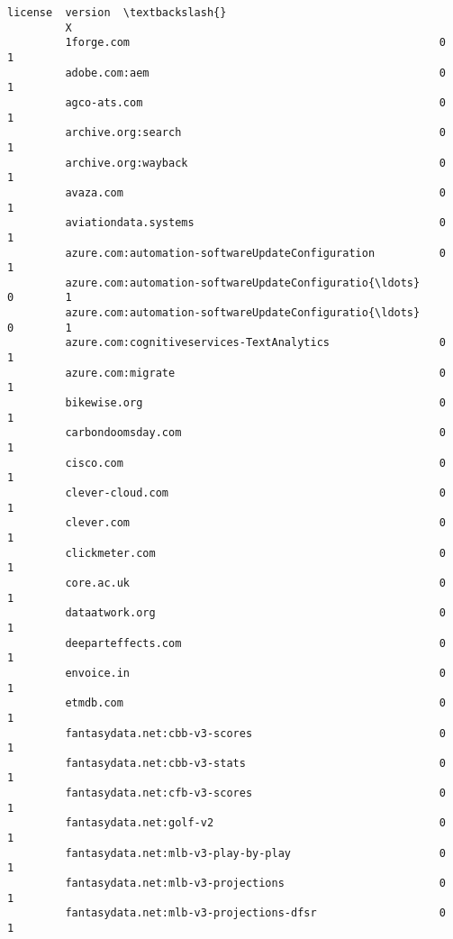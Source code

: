 \documentclass[11pt]{article}
\begin{document}
\begin{Verbatim}[commandchars=\\\{\}]
                                                             license  version  \textbackslash{}
         X                                                                      
         1forge.com                                                0        1   
         adobe.com:aem                                             0        1   
         agco-ats.com                                              0        1   
         archive.org:search                                        0        1   
         archive.org:wayback                                       0        1   
         avaza.com                                                 0        1   
         aviationdata.systems                                      0        1   
         azure.com:automation-softwareUpdateConfiguration          0        1   
         azure.com:automation-softwareUpdateConfiguratio{\ldots}        0        1   
         azure.com:automation-softwareUpdateConfiguratio{\ldots}        0        1   
         azure.com:cognitiveservices-TextAnalytics                 0        1   
         azure.com:migrate                                         0        1   
         bikewise.org                                              0        1   
         carbondoomsday.com                                        0        1   
         cisco.com                                                 0        1   
         clever-cloud.com                                          0        1   
         clever.com                                                0        1   
         clickmeter.com                                            0        1   
         core.ac.uk                                                0        1   
         dataatwork.org                                            0        1   
         deeparteffects.com                                        0        1   
         envoice.in                                                0        1   
         etmdb.com                                                 0        1   
         fantasydata.net:cbb-v3-scores                             0        1   
         fantasydata.net:cbb-v3-stats                              0        1   
         fantasydata.net:cfb-v3-scores                             0        1   
         fantasydata.net:golf-v2                                   0        1   
         fantasydata.net:mlb-v3-play-by-play                       0        1   
         fantasydata.net:mlb-v3-projections                        0        1   
         fantasydata.net:mlb-v3-projections-dfsr                   0        1   

\end{Verbatim}
\end{document}
